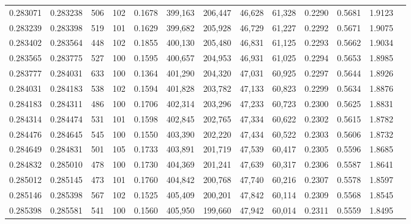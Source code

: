 \begin{tabular}{rrrrrrrrrrrrr}
0.283071 & 0.283238 &   506 & 102 &                                     0.1678 & 399,163 & 206,447 &  46,628 &  61,328 & 0.2290 & 0.5681 & 1.9123 \\
0.283239 & 0.283398 &   519 & 101 &                                     0.1629 & 399,682 & 205,928 &  46,729 &  61,227 & 0.2292 & 0.5671 & 1.9075 \\
0.283402 & 0.283564 &   448 & 102 &                                     0.1855 & 400,130 & 205,480 &  46,831 &  61,125 & 0.2293 & 0.5662 & 1.9034 \\
0.283565 & 0.283775 &   527 & 100 &                                     0.1595 & 400,657 & 204,953 &  46,931 &  61,025 & 0.2294 & 0.5653 & 1.8985 \\
0.283777 & 0.284031 &   633 & 100 &                                     0.1364 & 401,290 & 204,320 &  47,031 &  60,925 & 0.2297 & 0.5644 & 1.8926 \\
0.284031 & 0.284183 &   538 & 102 &                                     0.1594 & 401,828 & 203,782 &  47,133 &  60,823 & 0.2299 & 0.5634 & 1.8876 \\
0.284183 & 0.284311 &   486 & 100 &                                     0.1706 & 402,314 & 203,296 &  47,233 &  60,723 & 0.2300 & 0.5625 & 1.8831 \\
0.284314 & 0.284474 &   531 & 101 &                                     0.1598 & 402,845 & 202,765 &  47,334 &  60,622 & 0.2302 & 0.5615 & 1.8782 \\
0.284476 & 0.284645 &   545 & 100 &                                     0.1550 & 403,390 & 202,220 &  47,434 &  60,522 & 0.2303 & 0.5606 & 1.8732 \\
0.284649 & 0.284831 &   501 & 105 &                                     0.1733 & 403,891 & 201,719 &  47,539 &  60,417 & 0.2305 & 0.5596 & 1.8685 \\
0.284832 & 0.285010 &   478 & 100 &                                     0.1730 & 404,369 & 201,241 &  47,639 &  60,317 & 0.2306 & 0.5587 & 1.8641 \\
0.285012 & 0.285145 &   473 & 101 &                                     0.1760 & 404,842 & 200,768 &  47,740 &  60,216 & 0.2307 & 0.5578 & 1.8597 \\
0.285146 & 0.285398 &   567 & 102 &                                     0.1525 & 405,409 & 200,201 &  47,842 &  60,114 & 0.2309 & 0.5568 & 1.8545 \\
0.285398 & 0.285581 &   541 & 100 &                                     0.1560 & 405,950 & 199,660 &  47,942 &  60,014 & 0.2311 & 0.5559 & 1.8495 \\

\end{tabular}

